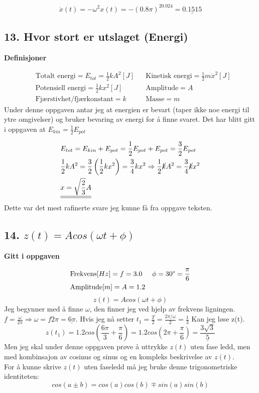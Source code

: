 \documentclass[a4paper,12pt,norsk]{article}
\newcommand{\uu}{\underline}
\begin{document}
$$
\ddot{x}(t) =- \omega ^2x(t) = - (0.8\pi)^20.024 = \uu{\uu{0.1515}}
$$

\subsection{13. Hvor stort er utslaget (Energi)}

\begin{center}
\textbf{Definisjoner}
\end{center}
\begin{align*}
&\text{Totalt energi} = E_{tot} = \frac{1}{2}kA^2 [J]&& \text{Kinetisk energi} = \frac{1}{2}m\dot{x}^2[J]\\
&\text{Potensiell energi} = \frac{1}{2}kx^2 [J] &&\text{Amplitude} = A\\
&\text{Fjærstivhet/fjærkonstant} = k && \text{Masse} = m
\end{align*}
Under denne oppgaven antar jeg at energien er bevart (taper ikke noe energi til ytre omgivelser) og bruker bevaring av energi for å finne svaret. Det har blitt gitt i oppgaven at $E_{kin} = \frac{1}{2}E_{pot}$

\begin{align*}
&E_{tot} = E_{kin} + E_{pot} = \frac{1}{2}E_{pot} + E_{pot} = \frac{3}{2}E_{pot}\\
&\frac{1}{2}kA^2 =\frac{3}{2}\left(\frac{1}{2}kx^2\right) = \frac{3}{4}kx^2 \Rightarrow 
\frac{1}{2}\cancel{k}A^2 = \frac{3}{4}\cancel{k}x^2 \\
&\uu{\uu{x = \sqrt{\frac{2}{3}}A}}
\end{align*}
Dette var det mest rafinerte svare jeg kunne få fra oppgave teksten.


\subsection{14. $z(t) = Acos(\omega t + \phi)$}

\begin{center}
\textbf{Gitt i oppgaven}
\end{center}
\begin{align*}
&\text{Frekvens}[Hz] = f =  3.0 && \phi = 30\degree = \frac{\pi}{6}  \\
&\text{Amplitude}[m]= A = 1.2 && 
\end{align*}
$$
z(t) = Acos(\omega t + \phi)
$$
Jeg begynner med å finne $\omega$, den finner jeg ved hjelp av frekvens ligningen. $f = \frac{\omega}{2\pi} \Rightarrow \omega = f2\pi = \uu{6\pi}$. 
Hvis jeg nå setter $ t_1 = \frac{T}{2} = \frac{2\pi/\omega}{2} = \frac{1}{3} $
Kan jeg løse z(t).
$$
z(t_1) = 1.2cos(\frac{6\pi}{3} + \frac{\pi}{6}) =1.2cos(2\pi + \frac{\pi}{6})= \uu{\frac{3\sqrt{3}}{5}}
$$
Men jeg skal under denne oppgaven prøve å uttrykke $z(t)$ uten fase ledd, men med kombinsajon av cosinus og sinus og en kompleks beskrivelse av $z(t)$.\\
For å kunne skrive $z(t)$ uten faseledd må jeg bruke denne trigonometriske identiteten:
$$
cos(a\pm b) = cos(a)cos(b) \mp sin(a)sin(b)
$$
\end{document}
